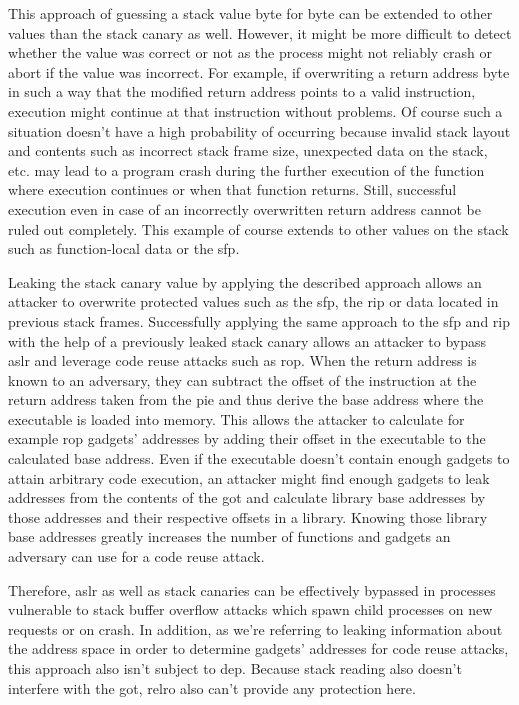 This approach of guessing a stack value byte for byte can be extended to other values than the stack canary as well.
However, it might be more difficult to detect whether the value was correct or not as the process might not reliably crash or abort if the value was incorrect.
For example, if overwriting a return address byte in such a way that the modified return address points to a valid instruction, execution might continue at that instruction without problems.
Of course such a situation doesn't have a high probability of occurring because invalid stack layout and contents such as incorrect stack frame size, unexpected data on the stack, etc. may lead to a program crash during the further execution of the function where execution continues or when that function returns.
Still, successful execution even in case of an incorrectly overwritten return address cannot be ruled out completely.
This example of course extends to other values on the stack such as function-local data or the \gls{sfp}.

Leaking the stack canary value by applying the described approach allows an attacker to overwrite protected values such as the \gls{sfp}, the \gls{rip} or data located in previous stack frames.
Successfully applying the same approach to the \gls{sfp} and \gls{rip} with the help of a previously leaked stack canary allows an attacker to bypass \gls{aslr} and leverage code reuse attacks such as \gls{rop}.
When the return address is known to an adversary, they can subtract the offset of the instruction at the return address taken from the \gls{pie} and thus derive the base address where the executable is loaded into memory.
This allows the attacker to calculate for example \gls{rop} gadgets' addresses by adding their offset in the executable to the calculated base address.
Even if the executable doesn't contain enough gadgets to attain arbitrary code execution, an attacker might find enough gadgets to leak addresses from the contents of the \gls{got} and calculate library base addresses by those addresses and their respective offsets in a library.
Knowing those library base addresses greatly increases the number of functions and gadgets an adversary can use for a code reuse attack.

Therefore, \gls{aslr} as well as stack canaries can be effectively bypassed in processes vulnerable to stack buffer overflow attacks which spawn child processes on new requests or on crash.
In addition, as we're referring to leaking information about the address space in order to determine gadgets' addresses for code reuse attacks, this approach also isn't subject to \gls{dep}.
Because stack reading also doesn't interfere with the \gls{got}, \gls{relro} also can't provide any protection here.

